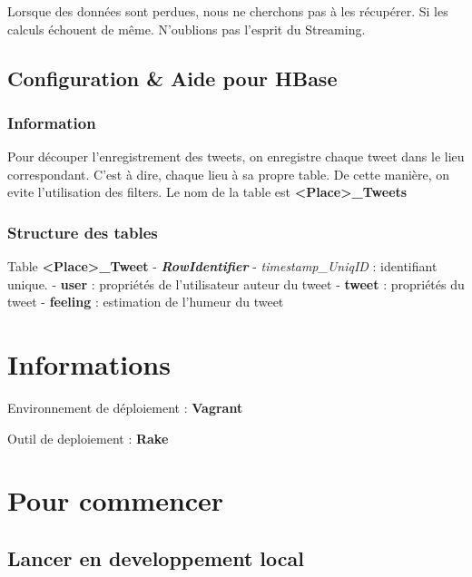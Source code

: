 \documentclass[a4paper,oneside,10pt]{article}
\begin{document}
Lorsque des données sont perdues, nous ne cherchons pas à les récupérer. Si les calculs échouent de même. N'oublions pas l'esprit du Streaming. 

\subsection{Configuration \& Aide pour HBase}


\subsubsection{Information}

Pour découper l'enregistrement des tweets, on enregistre chaque tweet dans le lieu correspondant. C'est à dire, chaque lieu à sa propre table. De cette manière, on evite l'utilisation des filters. Le nom de la table est \textbf{<Place>\_Tweets}

\subsubsection{Structure des tables}

Table \textbf{<Place>\_Tweet}
- \textbf{\textit{RowIdentifier}} - \textit{timestamp\_UniqID} : identifiant unique.
- \textbf{user} : propriétés de l'utilisateur auteur du tweet
- \textbf{tweet} : propriétés du tweet
- \textbf{feeling} : estimation de l'humeur du tweet



\section{Informations}

Environnement de déploiement : \textbf{Vagrant}

Outil de deploiement : \textbf{Rake}

\section{Pour commencer}

\subsection{Lancer en developpement local}
\end{document}
